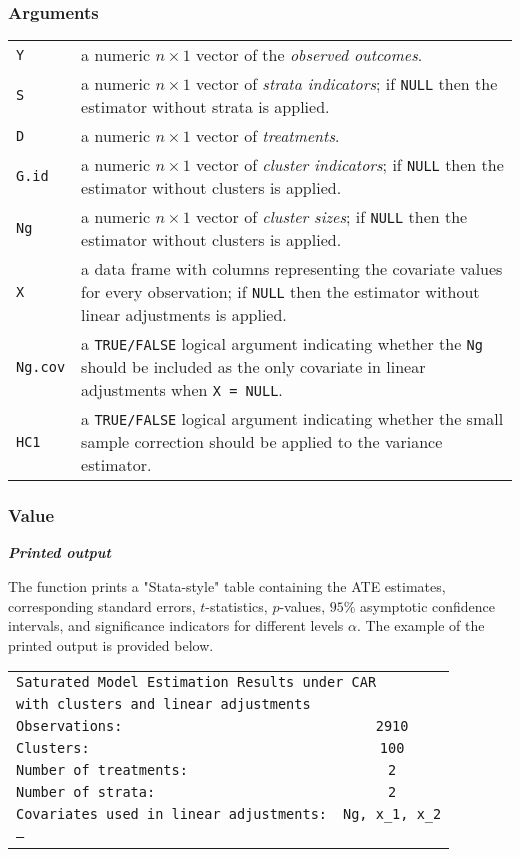 \documentclass{article}
\makeatletter
\newenvironment{argdesc}{
    \par %
    \noindent %
    \normalfont %
    
    \begin{tabular}{@{}p{0.3\textwidth}p{0.6\textwidth}@{}} %
}{
    \end{tabular}
    \par %
   
}
\makeatother
\begin{document}
\subsubsection*{Arguments}
\begin{argdesc}
    \texttt{Y} & a numeric $n \times 1$ vector of the \textit{observed outcomes}. \\
    \texttt{S} & a numeric $n \times 1$ vector of \textit{strata indicators}; if \texttt{NULL} then the estimator without strata is applied. \\
    \texttt{D} & a numeric $n \times 1$ vector of \textit{treatments}. \\
    \texttt{G.id} & a numeric $n \times 1$ vector of \textit{cluster indicators}; if \texttt{NULL} then the estimator without clusters is applied. \\
    \texttt{Ng} & a numeric $n \times 1$ vector of \textit{cluster sizes}; if \texttt{NULL} then the estimator without clusters is applied. \\
    \texttt{X} & a data frame with columns representing the covariate values for every observation; if \texttt{NULL} then the estimator without linear adjustments is applied. \\
    \texttt{Ng.cov} & a \texttt{TRUE/FALSE} logical argument indicating whether the \texttt{Ng} should be included as the only covariate in linear adjustments when \texttt{X = NULL}. \\
    \texttt{HC1} & a \texttt{TRUE/FALSE} logical argument indicating whether the small sample correction should be applied to the variance estimator. \\
\end{argdesc}

\subsubsection*{Value}
\noindent \textit{\textbf{Printed output}}

The function prints a "Stata-style" table containing the ATE estimates, corresponding standard errors, $t$-statistics, $p$-values, $95\%$ asymptotic confidence intervals, and significance indicators for different levels $\alpha$. The example of the printed output is provided below.


\begin{flushleft}
\begin{tabular}{lc}
\multicolumn{2}{l}{\texttt{Saturated Model Estimation Results under CAR}} \\
\multicolumn{2}{l}{\texttt{with clusters and linear adjustments}} \\
\texttt{Observations:} & \texttt{2910} \\
\texttt{Clusters:} & \texttt{100} \\
\texttt{Number of treatments:} & \texttt{2} \\
\texttt{Number of strata:} & \texttt{2} \\
\texttt{Covariates used in linear adjustments:} & \texttt{Ng, x\_1, x\_2} \\
\texttt{---} \\
\end{tabular}
\end{flushleft}
\end{document}
